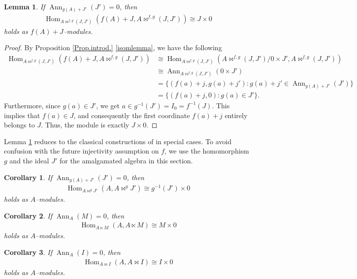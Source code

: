 \documentclass{amsart}%
\theoremstyle{plain}
\newtheorem{corollary}{Corollary}[section]
\newtheorem{lemma}{Lemma}[section]
\numberwithin{equation}{section}
\theoremstyle{definition}
\DeclareMathOperator{\Hom}{Hom}
\DeclareMathOperator{\Ann}{Ann}
\begin{document}
\begin{lemma}\label{AnnLemma}
    If $\Ann_{g(A)+J'}(J')=0$, then
\begin{align*}
    \Hom_{A\bowtie^{f,g}(J,J')}\left(f(A)+J,A\bowtie^{f,g}(J,J')\right)\cong J\times 0
\end{align*}
holds as $f(A)+J$--modules.    
\end{lemma}
\begin{proof}
    By Proposition \ref{Prop.introd.} \ref{isomlemma}, we have the following
    \begin{align*}
        \Hom_{A\bowtie^{f,g}(J,J')}\left(f(A)+J,A\bowtie^{f,g}(J,J')\right)&\cong \Hom_{A\bowtie^{f,g}(J,J')}\left(A\bowtie^{f,g}(J,J')/0\times J',A\bowtie^{f,g}(J,J')\right)\\
&\cong \Ann_{A\bowtie^{f,g}(J,J')}(0\times J')\\
&=\{(f(a)+j,g(a)+j'):g(a)+j'\in \Ann_{g(A)+J'}(J') \}\\&=\{(f(a)+j,0):g(a)\in J'\}.
    \end{align*}
    Furthermore, since $g(a)\in J'$, we get $a\in g^{-1}(J')=I_0=f^{-1}(J)$. This implies that $f(a) \in J$, and consequently the first coordinate $f(a)+j$ entirely belongs to $J$. Thus, the module is exactly $J\times 0$.
\end{proof}
Lemma \ref{AnnLemma} reduces to the classical constructions of \cite{Gorenstein,DFF3,iranlilar} in special cases. To avoid confusion with the future injectivity assumption on $f$, we use the homomorphism $g$ and the ideal $J'$ for the amalgamated algebra in this section.
\begin{corollary}
        If $\Ann_{g(A)+J'}(J')=0$, then
\begin{align*}
    \Hom_{A\bowtie^{g}J'}\left(A,A\bowtie^{g}J'\right)\cong g^{-1}(J')\times 0
\end{align*}
holds as $A$--modules.    
\end{corollary}
\begin{corollary}
        If $\Ann_{A}(M)=0$, then
\begin{align*}
    \Hom_{A\ltimes M}(A,A\ltimes M)\cong M\times 0
\end{align*}
holds as $A$--modules.    
\end{corollary}
\begin{corollary}
        If $\Ann_{A}(I)=0$, then
\begin{align*}
    \Hom_{A\bowtie I}(A,A\bowtie I)\cong I\times 0
\end{align*}
holds as $A$--modules.    
\end{corollary}
\end{document}
